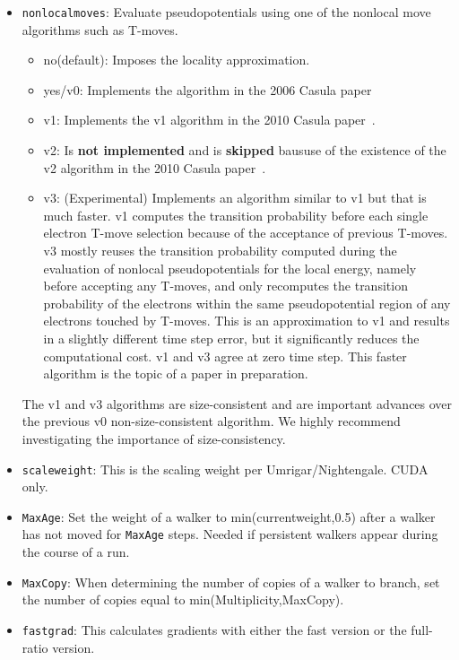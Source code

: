 \begin{itemize}
\item \texttt{nonlocalmoves}: Evaluate pseudopotentials using one of the nonlocal move algorithms such as T-moves.
\begin{itemize}
\item no(default): Imposes the locality approximation.
\item yes/v0: Implements the algorithm in the 2006 Casula paper~\cite{Casula2006}
\item v1: Implements the v1 algorithm in the 2010 Casula paper~\cite{Casula2010}.
\item v2: Is \textbf{not implemented} and is \textbf{skipped} baususe of the existence of the v2 algorithm in the 2010 Casula paper~\cite{Casula2010}.
\item v3: (Experimental) Implements an algorithm similar to v1 but that is much faster. v1 computes the transition probability before each single electron T-move selection because of the acceptance of previous T-moves. v3 mostly reuses the transition probability computed during the evaluation of nonlocal pseudopotentials for the local energy, namely before accepting any T-moves, and only recomputes the transition probability of the electrons within the same pseudopotential region of any electrons touched by T-moves. This is an approximation to v1 and results in a slightly different time step error, but it significantly reduces the computational cost. v1 and v3 agree at zero time step. This faster algorithm is the topic of a paper in preparation.
\end{itemize}
The v1 and v3 algorithms are size-consistent and are important advances over the previous v0 non-size-consistent algorithm. We highly recommend investigating the importance of size-consistency.

\item \texttt{scaleweight}: This is the scaling weight per Umrigar/Nightengale.  CUDA only.

\item \texttt{MaxAge}: Set the weight of a walker to min(currentweight,0.5) after a walker has not moved for \texttt{MaxAge} steps.  Needed if persistent walkers appear during the course of a run.

\item \texttt{MaxCopy}: When determining the number of copies of a walker to branch, set the number of copies equal to min(Multiplicity,MaxCopy).

\item \texttt{fastgrad}: This calculates gradients with either the fast version or the full-ratio version.


\end{itemize}

